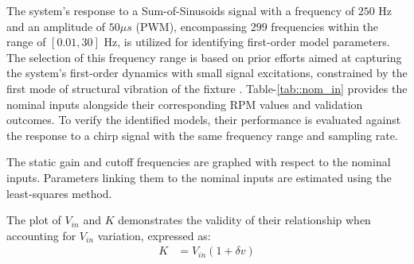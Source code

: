 
The system's response to a Sum-of-Sinusoids signal with a frequency of $250$ Hz and an amplitude of $50 \mu s$ (PWM), encompassing $299$ frequencies within the range of $[0.01, 30]$ Hz, is utilized for identifying first-order model parameters. The selection of this frequency range is based on prior efforts aimed at capturing the system's first-order dynamics with small signal excitations, constrained by the first mode of structural vibration of the fixture \cite{charla2022enhancing}. Table-\ref{tab::nom_in} provides the nominal inputs alongside their corresponding RPM values and validation outcomes. To verify the identified models, their performance is evaluated against the response to a chirp signal with the same frequency range and sampling rate.

The static gain and cutoff frequencies are graphed with respect to the nominal inputs. Parameters linking them to the nominal inputs are estimated using the least-squares method.

The plot of $V_{in}$ and $K$ demonstrates the validity of their relationship when accounting for $V_{in}$ variation, expressed as:
\begin{align}
    K &= V_{in} (1 + \delta v)
\end{align}

